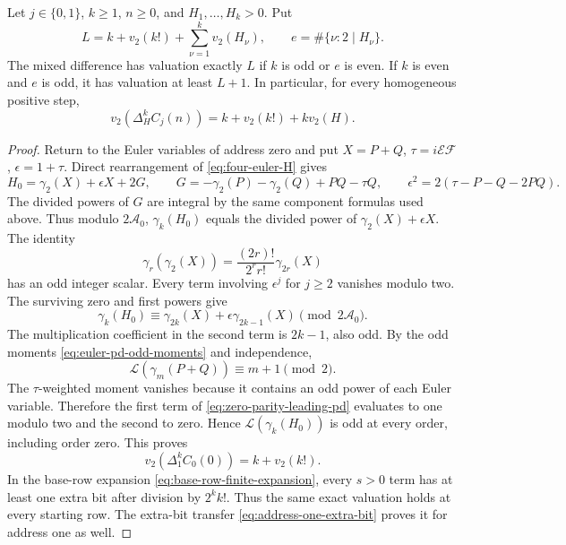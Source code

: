 \begin{theorem}
\label{thm:zero-one-exact-mixed}
Let $j\in\{0,1\}$, $k\geq1$, $n\geq0$, and $H_1,\ldots,H_k>0$.
Put
\[
 L=k+v_2(k!)+\sum_{\nu=1}^k v_2(H_\nu),\qquad
 e=\#\{\nu:2\mid H_\nu\}.
\]
The mixed difference has valuation exactly $L$ if $k$ is odd or $e$ is
even. If $k$ is even and $e$ is odd, it has valuation at least $L+1$.
In particular, for every homogeneous positive step,
\begin{equation}
 v_2(\Delta_H^kC_j(n))=k+v_2(k!)+k v_2(H).
 \label{eq:zero-one-homogeneous-exact}
\end{equation}
\end{theorem}

\begin{proof}
Return to the Euler variables of address zero and put
$X=P+Q$, $\tau=i\mathcal E\mathcal F$, $\epsilon=1+\tau$.
Direct rearrangement of \eqref{eq:four-euler-H} gives
\begin{equation}
 H_0=\gamma_2(X)+\epsilon X+2G,\qquad
 G=-\gamma_2(P)-\gamma_2(Q)+PQ-\tau Q,
 \qquad \epsilon^2=2(\tau-P-Q-2PQ).
 \label{eq:zero-parity-decomposition}
\end{equation}
The divided powers of $G$ are integral by the same component formulas
used above. Thus modulo $2\mathcal A_0$, $\gamma_k(H_0)$ equals the
divided power of $\gamma_2(X)+\epsilon X$. The identity
\[
 \gamma_r(\gamma_2(X))
   =\frac{(2r)!}{2^r r!}\gamma_{2r}(X)
\]
has an odd integer scalar. Every term involving $\epsilon^j$ for
$j\geq2$ vanishes modulo two. The surviving zero and first powers give
\begin{equation}
 \gamma_k(H_0)\equiv
       \gamma_{2k}(X)+\epsilon\gamma_{2k-1}(X)
                                  \pmod{2\mathcal A_0}.
 \label{eq:zero-parity-leading-pd}
\end{equation}
The multiplication coefficient in the second term is $2k-1$, also odd.
By the odd moments \eqref{eq:euler-pd-odd-moments} and independence,
\[
 \mathcal L(\gamma_m(P+Q))\equiv m+1\pmod2.
\]
The $\tau$-weighted moment vanishes because it contains an odd power of
each Euler variable. Therefore the first term of
\eqref{eq:zero-parity-leading-pd} evaluates to one modulo two and the
second to zero. Hence $\mathcal L(\gamma_k(H_0))$ is odd at every order,
including order zero. This proves
\[
 v_2(\Delta_1^k C_0(0))=k+v_2(k!).
\]
In the base-row expansion \eqref{eq:base-row-finite-expansion}, every
$s>0$ term has at least one extra bit after division by $2^k k!$.
Thus the same exact valuation holds at every starting row.
The extra-bit transfer \eqref{eq:address-one-extra-bit} proves it for
address one as well.


\end{proof}
